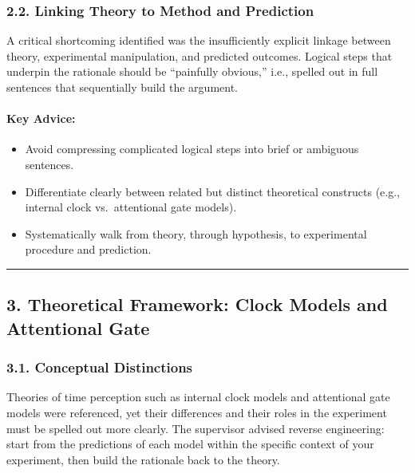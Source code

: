 \documentclass[
]{article}
\providecommand{\tightlist}{%
  \setlength{\itemsep}{0pt}\setlength{\parskip}{0pt}}
\begin{document}
\subsubsection{2.2. Linking Theory to Method and
Prediction}\label{linking-theory-to-method-and-prediction}

A critical shortcoming identified was the insufficiently explicit
linkage between theory, experimental manipulation, and predicted
outcomes. Logical steps that underpin the rationale should be
``painfully obvious,'' i.e., spelled out in full sentences that
sequentially build the argument.

\paragraph{\texorpdfstring{\textbf{Key
Advice:}}{Key Advice:}}\label{key-advice-1}

\begin{itemize}
\tightlist
\item
  Avoid compressing complicated logical steps into brief or ambiguous
  sentences.
\item
  Differentiate clearly between related but distinct theoretical
  constructs (e.g., internal clock vs.~attentional gate models).
\item
  Systematically walk from theory, through hypothesis, to experimental
  procedure and prediction.
\end{itemize}

\begin{center}\rule{0.5\linewidth}{0.5pt}\end{center}

\subsection{3. Theoretical Framework: Clock Models and Attentional
Gate}\label{theoretical-framework-clock-models-and-attentional-gate}

\subsubsection{3.1. Conceptual
Distinctions}\label{conceptual-distinctions}

Theories of time perception such as internal clock models and
attentional gate models were referenced, yet their differences and their
roles in the experiment must be spelled out more clearly. The supervisor
advised reverse engineering: start from the predictions of each model
within the specific context of your experiment, then build the rationale
back to the theory.
\end{document}
